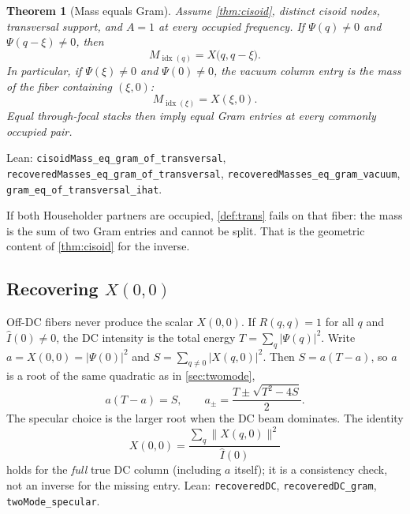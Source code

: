 \documentclass[11pt,a4paper]{article}
\newtheorem{theorem}{Theorem}[section]
\theoremstyle{definition}
\theoremstyle{remark}
\newcommand{\abs}[1]{\lvert#1\rvert}
\newcommand{\norm}[1]{\lVert#1\rVert}
\begin{document}
\begin{theorem}[Mass equals Gram]
\label{thm:trans}
Assume \cref{thm:cisoid}, distinct cisoid nodes, transversal support,
and $A=1$ at every occupied frequency.
If $\Psi(q)\neq 0$ and $\Psi(q-\xi)\neq 0$, then
\begin{equation}
\label{eq:Mgram}
M_{\operatorname{idx}(q)}
=X\bigl(q,q-\xi\bigr).
\end{equation}
In particular, if $\Psi(\xi)\neq 0$ and $\Psi(0)\neq 0$, the vacuum
column entry is the mass of the fiber containing $(\xi,0)$:
\begin{equation}
\label{eq:Mvac}
M_{\operatorname{idx}(\xi)}
=X(\xi,0).
\end{equation}
Equal through-focal stacks then imply equal Gram entries at every
commonly occupied pair.
\end{theorem}
{\raggedright
Lean: \texttt{cisoidMass\_eq\_gram\_of\_transversal},
\texttt{recoveredMasses\_eq\_gram\_of\_transversal},
\texttt{recoveredMasses\_eq\_gram\_vacuum},
\texttt{gram\_eq\_of\_transversal\_ihat}.
\par}

If both Householder partners are occupied, \cref{def:trans} fails on
that fiber: the mass is the sum of two Gram entries and cannot be
split.
That is the geometric content of \cref{thm:cisoid} for the inverse.

\subsection{Recovering \texorpdfstring{$X(0,0)$}{X(0,0)}}
\label{sec:dcenergy}

Off-DC fibers never produce the scalar $X(0,0)$.
If $R(q,q)=1$ for all $q$ and $\hat I(0)\neq 0$, the DC intensity is
the total energy $T=\sum_q\abs{\Psi(q)}^2$.
Write $a=X(0,0)=\abs{\Psi(0)}^2$ and
$S=\sum_{q\neq 0}\abs{X(q,0)}^2$.
Then $S=a(T-a)$, so $a$ is a root of the same quadratic as in
\cref{sec:twomode},
\begin{equation}
\label{eq:recDC}
a(T-a)=S,
\qquad
a_\pm
=\frac{T\pm\sqrt{T^2-4S}}{2}.
\end{equation}
The specular choice is the larger root when the DC beam dominates.
The identity
\begin{equation}
\label{eq:recDCcheck}
X(0,0)
=\frac{\sum_q\norm{X(q,0)}^2}{\hat I(0)}
\end{equation}
holds for the \emph{full} true DC column (including $a$ itself); it
is a consistency check, not an inverse for the missing entry.
Lean: \texttt{recoveredDC}, \texttt{recoveredDC\_gram},
\texttt{twoMode\_specular}.
\end{document}
